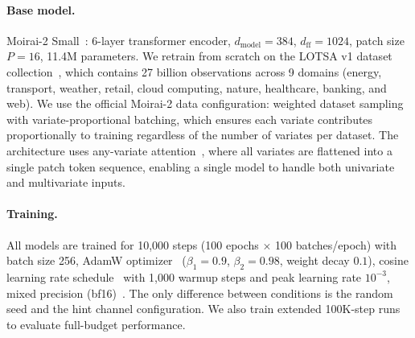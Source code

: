 \documentclass[11pt]{article}
\begin{document}
\paragraph{Base model.} Moirai-2 Small~\citep{liu2024moirai2}: 6-layer transformer encoder, $d_{\text{model}}=384$, $d_{\text{ff}}=1024$, patch size $P=16$, 11.4M parameters. We retrain from scratch on the LOTSA v1 dataset collection~\citep{woo2024unified}, which contains 27 billion observations across 9 domains (energy, transport, weather, retail, cloud computing, nature, healthcare, banking, and web). We use the official Moirai-2 data configuration: weighted dataset sampling with variate-proportional batching, which ensures each variate contributes proportionally to training regardless of the number of variates per dataset. The architecture uses any-variate attention~\citep{woo2024unified}, where all variates are flattened into a single patch token sequence, enabling a single model to handle both univariate and multivariate inputs.

\paragraph{Training.} All models are trained for 10,000 steps (100 epochs $\times$ 100 batches/epoch) with batch size 256, AdamW optimizer~\citep{loshchilov2019decoupled} ($\beta_1=0.9$, $\beta_2=0.98$, weight decay $0.1$), cosine learning rate schedule~\citep{loshchilov2017sgdr} with 1,000 warmup steps and peak learning rate $10^{-3}$, mixed precision (bf16)~\citep{micikevicius2018mixed}. The only difference between conditions is the random seed and the hint channel configuration. We also train extended 100K-step runs to evaluate full-budget performance.
\end{document}
